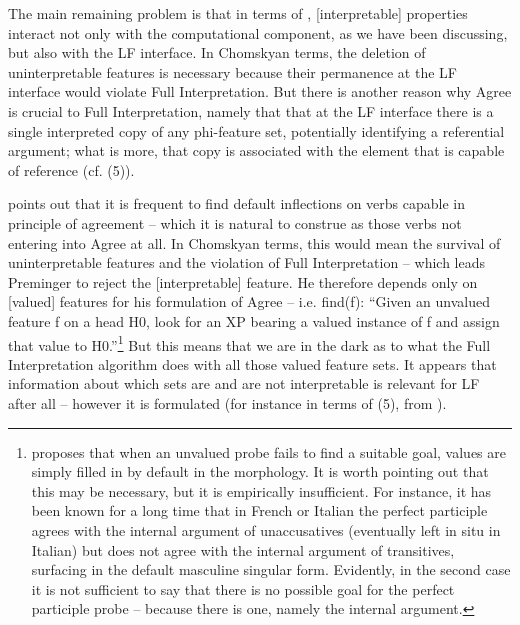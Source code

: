\documentclass[output=paper]{langsci/langscibook}
\begin{document}
The main remaining problem is that in terms of \citet{Chomsky2000,Chomsky2001}, [interpretable] properties interact not only with the computational component, as we have been discussing, but also with the LF interface. In Chomskyan terms, the deletion of uninterpretable features is necessary because their permanence at the LF interface would violate Full Interpretation. But there is another reason why Agree is crucial to Full Interpretation, namely that {that at the LF interface there is a single interpreted copy of any phi-feature set, potentially identifying a referential argument; what is more, that copy is associated with the element that is capable of reference (cf. (5)).}

\citet{Preminger2014}{} points out that it is frequent to find default inflections on verbs capable in principle of agreement – which it is natural to construe as those verbs not entering into Agree at all.{} In Chomskyan terms, this would mean the survival of uninterpretable features and the violation of Full Interpretation – which leads Preminger to reject the [interpretable] feature. He therefore {depends only on [valued] features for his formulation of Agree – i.e.} {fi}{nd(f): “Given an unvalued feature f on a head H0, look for an XP bearing a valued instance of f and assign that value to H0.”}\footnote{\citet{Preminger2014} proposes that when an unvalued probe fails to find a suitable goal, values are simply filled in by default in the morphology. It is worth pointing out that this may be necessary, but it is empirically insufficient. For instance, it has been known for a long time \citep{Kayne1989} that in French or Italian the perfect participle agrees with the internal argument of unaccusatives (eventually left in situ in Italian) but does not agree with the internal argument of transitives, surfacing in the default masculine singular form. Evidently, in the second case it is not sufficient to say that there is no possible goal for the perfect participle probe – because there is one, namely the internal argument.} { But this means that we are in the dark as to what the Full Interpretation algorithm does with all those valued feature sets. It appears that information about which sets are and are not interpretable is relevant for LF after all – however it is formulated (for instance in terms of (5), from \citealt{Baker2008}).}
\end{document}
